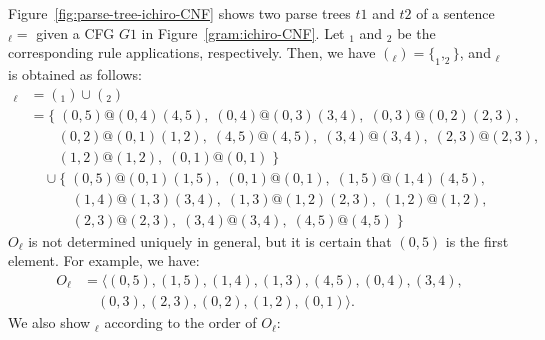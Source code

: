 \documentclass[english]{jnlp_1.4_rep}
\newcommand{\sym}[1]{}
\newcommand{\tuple}[1]{}
\newcommand{\win}{}
\newcommand{\rseq}{}
\newcommand{\trees}{}
\newcommand{\subtrees}{}
\newcommand{\wfst}{}
\begin{document}
Figure~\ref{fig:parse-tree-ichiro-CNF} shows two
parse trees $t1$ and $t2$ of a sentence
$\win_\ell=\tuple{急いで,走る,一郎,を,見た}$ given a CFG $G1$
in Figure~\ref{gram:ichiro-CNF}.  Let $\rseq_1$ and $\rseq_2$
be the corresponding rule applications, respectively.
Then, we have $\trees(\win_\ell)=\{\rseq_1, \rseq_2\}$, and
$\wfst_\ell$ is obtained as follows:
\pagebreak
{\small
\begin{align*}
	\wfst_\ell & = \wfst(\rseq_1)\cup\wfst(\rseq_2)\\
		&=\{\;\sym{S}(0,5)@\sym{PP}(0,4)\sym{V}(4,5),\;
			\sym{PP}(0,4)@\sym{NP}(0,3)\sym{P}(3,4),\;
			\sym{NP}(0,3)@\sym{VP}(0,2)\sym{N}(2,3),\\
		&\qquad \sym{VP}(0,2)@\sym{ADV}(0,1)\sym{V}(1,2),\;
			\sym{V}(4,5)@\sym{見た}(4,5),\;
			\sym{P}(3,4)@\sym{を}(3,4),\;
			\sym{N}(2,3)@\sym{一郎}(2,3),\\
		&\qquad \sym{V}(1,2)@\sym{走る}(1,2),\;
			\sym{ADV}(0,1)@\sym{急いで}(0,1)\;\}\\
		&\quad \cup 
		\{\;\sym{S}(0,5)@\sym{ADV}(0,1)\sym{VP}(1,5),\;
			\sym{ADV}(0,1)@\sym{急いで}(0,1),\;
			\sym{VP}(1,5)@\sym{PP}(1,4)\sym{V}(4,5),\\
		&\qquad \quad \sym{PP}(1,4)@\sym{NP}(1,3)\sym{P}(3,4),\;
			\sym{NP}(1,3)@\sym{V}(1,2)\sym{N}(2,3),\;
			\sym{V}(1,2)@\sym{走る}(1,2),\\
		& \qquad \quad \sym{N}(2,3)@\sym{一郎}(2,3),\;
			\sym{P}(3,4)@\sym{を}(3,4),\;
			\sym{V}(4,5)@\sym{見た}(4,5)\;\}
\end{align*}
}
$O_\ell$ is not determined uniquely in general, but it
is certain that $\sym{S}(0,5)$ is the first element.
For example, we have:
{\small
\begin{align*}
 O_\ell & =
	\langle
	\sym{S}(0,5),
	\sym{VP}(1,5),
	\sym{PP}(1,4),
	\sym{NP}(1,3),
	\sym{V}(4,5),
	\sym{PP}(0,4),
	\sym{P}(3,4),
	\\
 & \quad \sym{NP}(0,3),
	\sym{N}(2,3),
	\sym{VP}(0,2),
	\sym{V}(1,2),
	\sym{ADV}(0,1)
	\rangle.
\end{align*}
}
We also show $\subtrees_\ell$ according to the order of $O_\ell$:
\end{document}
